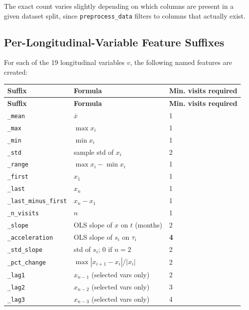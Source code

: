 \documentclass[11pt]{article}
\begin{document}
\noindent The exact count varies slightly depending on which columns are present in a given dataset split, since \texttt{preprocess\_data} filters to columns that actually exist.

\subsection{Per-Longitudinal-Variable Feature Suffixes}

For each of the 19 longitudinal variables $v$, the following named features are created:

\begin{longtable}{@{}lll@{}}
\toprule
\textbf{Suffix} & \textbf{Formula} & \textbf{Min. visits required} \\
\midrule
\endfirsthead
\toprule
\textbf{Suffix} & \textbf{Formula} & \textbf{Min. visits required} \\
\midrule
\endhead
\bottomrule
\endlastfoot
\texttt{\_mean}              & $\bar{x}$                        & 1 \\
\texttt{\_max}               & $\max x_i$                       & 1 \\
\texttt{\_min}               & $\min x_i$                       & 1 \\
\texttt{\_std}               & sample std of $x_i$              & 2 \\
\texttt{\_range}             & $\max x_i - \min x_i$            & 1 \\
\texttt{\_first}             & $x_1$                            & 1 \\
\texttt{\_last}              & $x_n$                            & 1 \\
\texttt{\_last\_minus\_first}& $x_n - x_1$                      & 1 \\
\texttt{\_n\_visits}         & $n$                              & 1 \\
\texttt{\_slope}             & OLS slope of $x$ on $t$ (months) & 2 \\
\texttt{\_acceleration}      & OLS slope of $s_i$ on $\tau_i$   & \textbf{4} \\
\texttt{\_std\_slope}        & std of $s_i$; 0 if $n=2$         & 2 \\
\texttt{\_pct\_change}       & $\max |x_{i+1}-x_i|/|x_i|$      & 2 \\
\texttt{\_lag1}              & $x_{n-1}$ (selected vars only)   & 2 \\
\texttt{\_lag2}              & $x_{n-2}$ (selected vars only)   & 3 \\
\texttt{\_lag3}              & $x_{n-3}$ (selected vars only)   & 4 \\
\end{longtable}
\end{document}
